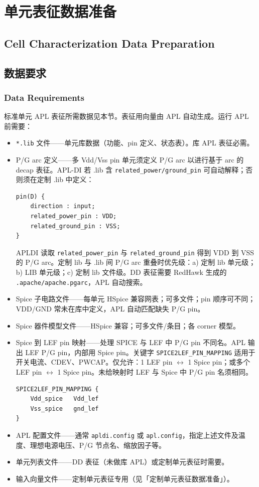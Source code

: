 \section{单元表征数据准备}
\subsection*{Cell Characterization Data Preparation}

\subsection{数据要求}
\subsubsection*{Data Requirements}

标准单元 APL 表征所需数据见本节。表征用向量由 APL 自动生成。运行 APL 前需要：
\begin{itemize}
  \item \texttt{*.lib} 文件——单元库数据（功能、pin 定义、状态表）。库 APL 表征必需。
  \item P/G arc 定义——多 Vdd/Vss pin 单元须定义 P/G arc 以进行基于 arc 的 decap 表征。APL-DI 若 .lib 含 \texttt{related\_power/ground\_pin} 可自动解释；否则须在定制 .lib 中定义：
\begin{lstlisting}
pin(D) {
    direction : input;
    related_power_pin : VDD;
    related_ground_pin : VSS;
}
\end{lstlisting}
  APLDI 读取 \texttt{related\_power\_pin} 与 \texttt{related\_ground\_pin} 得到 VDD 到 VSS 的 P/G arc。定制 lib 与 .lib 间 P/G arc 重叠时优先级：a) 定制 lib 单元级；b) LIB 单元级；c) 定制 lib 文件级。DD 表征需要 RedHawk 生成的 \texttt{.apache/apache.pgarc}，APL 自动搜索。
  \item Spice 子电路文件——每单元 HSpice 兼容网表；可多文件；pin 顺序可不同；VDD/GND 常未在库中定义，APL 自动匹配缺失 P/G pin。
  \item Spice 器件模型文件——HSpice 兼容；可多文件/条目；各 corner 模型。
  \item Spice 到 LEF pin 映射——处理 SPICE 与 LEF 中 P/G pin 不同名。APL 输出 LEF P/G pin，内部用 Spice pin。关键字 \texttt{SPICE2LEF\_PIN\_MAPPING} 适用于开关电流、CDEV、PWCAP。仅允许：1 LEF pin $\leftrightarrow$ 1 Spice pin；或多个 LEF pin $\leftrightarrow$ 1 Spice pin。未给映射时 LEF 与 Spice 中 P/G pin 名须相同。
\begin{lstlisting}
SPICE2LEF_PIN_MAPPING {
    Vdd_spice   Vdd_lef
    Vss_spice   gnd_lef
}
\end{lstlisting}
  \item APL 配置文件——通常 \texttt{apldi.config} 或 \texttt{apl.config}，指定上述文件及温度、理想电源电压、P/G 节点名、缩放因子等。
  \item 单元列表文件——DD 表征（未做库 APL）或定制单元表征时需要。
  \item 输入向量文件——定制单元表征专用（见「定制单元表征数据准备」）。
\end{itemize}

